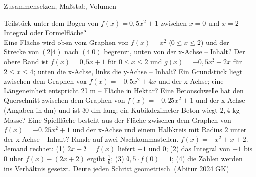 \setcounter{aufgabe}{12}

\begin{aufgabe}{Zusammensetzen, Maßstab, Volumen}
\begin{teile}
\teil Teilstück unter dem Bogen von $f(x) = 0{,}5x^2 + 1$ zwischen $x = 0$ und $x = 2$ – Integral oder Formelfläche? \\ 
\teil Eine Fläche wird oben vom Graphen von $f(x) = x^2$ ($0 \le x \le 2$) und der Strecke von $(2|4)$ nach $(4|0)$ begrenzt, unten von der x-Achse – Inhalt?
\teil Der obere Rand ist $f(x) = 0{,}5x + 1$ für $0 \le x \le 2$ und $g(x) = -0{,}5x^2 + 2x$ für $2 \le x \le 4$; unten die x-Achse, links die y-Achse – Inhalt?
\teil Ein Grundstück liegt zwischen dem Graphen von $f(x) = -0{,}5x^2 + 4x$ und der x-Achse; eine Längeneinheit entspricht $20$ m – Fläche in Hektar?
\teil Eine Betonschwelle hat den Querschnitt zwischen dem Graphen von $f(x) = -0{,}25x^2 + 1$ und der x-Achse (Angaben in dm) und ist $30$ dm lang; ein Kubikdezimeter Beton wiegt $2{,}4$ kg – Masse?
\teil Eine Spielfläche besteht aus der Fläche zwischen dem Graphen von $f(x) = -0{,}25x^2 + 1$ und der x-Achse und einem Halbkreis mit Radius $2$ unter der x-Achse – Inhalt? Runde auf zwei Nachkommastellen.
\teil $f(x) = -x^2 + x + 2$. Jemand rechnet: (1) $2x + 2 = f(x)$ liefert $-1$ und $0$; (2) das Integral von $-1$ bis $0$ über $f(x) - (2x + 2)$ ergibt $\frac{1}{6}$; (3) $0{,}5 \cdot f(0) = 1$; (4) die Zahlen werden ins Verhältnis gesetzt. Deute jeden Schritt geometrisch. \hfill (Abitur 2024 GK)
\end{teile}
\end{aufgabe}

